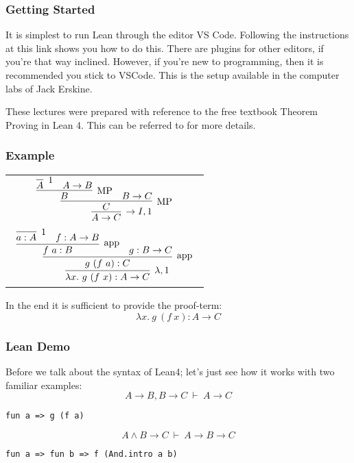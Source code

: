 \documentclass{beamer}
\theoremstyle{indentDefn} \newtheorem{defn}[]{Definition}
\begin{document}
\begin{frame}
\frametitle{Getting Started}

It is simplest to run Lean through the editor VS Code. Following the instructions at this link shows you how to do this. There are plugins for other editors, if you're that way inclined. However, if you're new to programming, then it is recommended you stick to VSCode. This is the setup available in the computer labs of Jack Erskine. 

These lectures were prepared with reference to the free textbook Theorem Proving in Lean 4. This can be referred to for more details.
\end{frame}



\begin{frame}
\frametitle{Example}


\begin{tabular}{c}

$\begin{array}{c}
	\infer[\to I,1]{A \to C}
		{\infer[\MP]{C}
			{\infer[\MP]{B}
				{\infer[1]{A}{}
				&
				A \to B}
			&
			B \to C}}
\end{array}$ \vspace{10mm}\\

$\begin{array}{c}
	\infer[\lambda,1]{\lambda x. \ g \ (f \ x) : A \to C}
		{\infer[\app]{g \ (f \ a) : C}
			{\infer[\app]{f \ a : B}
				{\infer[1]{a : A}{}
				&
				f : A \to B}
			&
			g : B \to C}}
\end{array}$
\end{tabular}

In the end it is sufficient to provide the proof-term:
$$\lambda x. \ g \ (f \ x) : A \to C$$

\end{frame}

\begin{frame}[fragile]
	\frametitle{Lean Demo}
	
	Before we talk about the syntax of Lean4; let's just see how it works with two familiar examples:	
	$$A \to B, B \to C \ \vdash \ A \to C$$ 
\begin{lstlisting}
fun a => g (f a)
\end{lstlisting}	
	$$A \land B \to C \ \vdash \ A \to B \to C$$
\begin{lstlisting}
fun a => fun b => f (And.intro a b)
\end{lstlisting}
\end{frame}
\end{document}
